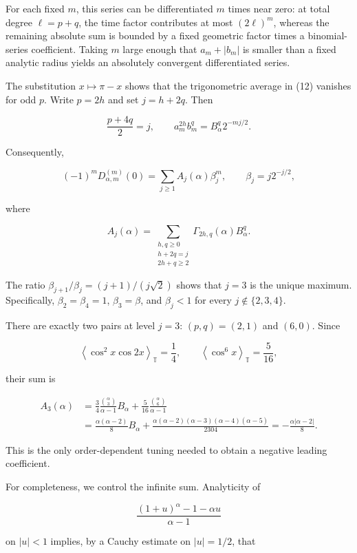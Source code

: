 \documentclass[
  11pt,
]{article}
\begin{document}
For each fixed \(m\), this series can be differentiated \(m\) times near
zero: at total degree \(\ell=p+q\), the time factor contributes at most
\((2\ell)^m\), whereas the remaining absolute sum is bounded by a fixed
geometric factor times a binomial-series coefficient. Taking \(m\) large
enough that \(a_m+|b_m|\) is smaller than a fixed analytic radius yields
an absolutely convergent differentiated series.

The substitution \(x\mapsto\pi-x\) shows that the trigonometric average
in (12) vanishes for odd \(p\). Write \(p=2h\) and set \(j=h+2q\). Then

\[
\frac{p+4q}{2}=j,\qquad
 a_m^{2h}b_m^q=B_\alpha^q2^{-mj/2}.
\]

Consequently,

\[
\tag{13}
 (-1)^m D_{\alpha,m}^{(m)}(0)
 =\sum_{j\geq1} A_j(\alpha)\beta_j^m,
 \qquad
 \beta_j=j2^{-j/2},
\]

where

\[
A_j(\alpha)=
 \sum_{\substack{h,q\geq0\\h+2q=j\\2h+q\geq2}}
    \Gamma_{2h,q}(\alpha)B_\alpha^q.
\]

The ratio \(\beta_{j+1}/\beta_j=(j+1)/(j\sqrt2)\) shows that \(j=3\) is
the unique maximum. Specifically, \(\beta_2=\beta_4=1\),
\(\beta_3=\beta\), and \(\beta_j<1\) for every \(j\notin\{2,3,4\}\).

There are exactly two pairs at level \(j=3\): \((p,q)=(2,1)\) and
\((6,0)\). Since

\[
\left\langle \cos^2x\cos 2x\right\rangle_{\mathbb T}=\frac14,\qquad
 \left\langle \cos^6x\right\rangle_{\mathbb T}=\frac5{16},
\]

their sum is

\[
\begin{aligned}
 A_3(\alpha)
 &=\frac34\frac{\binom\alpha3}{\alpha-1}B_\alpha
   +\frac5{16}\frac{\binom\alpha6}{\alpha-1}\\
 &=\frac{\alpha(\alpha-2)}8 B_\alpha
   +\frac{\alpha(\alpha-2)(\alpha-3)(\alpha-4)(\alpha-5)}{2304}
   =-\frac{\alpha|\alpha-2|}{8}.
\end{aligned}\tag{14}
\]

This is the only order-dependent tuning needed to obtain a negative
leading coefficient.

For completeness, we control the infinite sum. Analyticity of

\[
\frac{(1+u)^\alpha-1-\alpha u}{\alpha-1}
\]

on \(|u|<1\) implies, by a Cauchy estimate on \(|u|=1/2\), that
\end{document}
